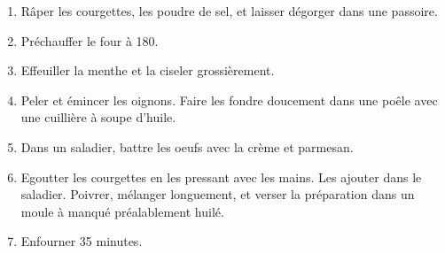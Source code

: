 
\begin{ingredients}
\end{ingredients}


\begin{recipe}
  \begin{enumerate}

  \item R\^aper les courgettes, les poudre de sel, et laisser
    d\'egorger dans une passoire.

  \item Pr\'echauffer le four \`a 180\C.

  \item Effeuiller la menthe et la ciseler grossi\`erement.

  \item Peler et \'emincer les oignons.  Faire les fondre doucement
    dans une  po\^ele avec une cuilli\`ere \`a soupe d'huile.

  \item Dans un saladier, battre les oeufs avec la cr\`eme et
    parmesan.

  \item Egoutter les courgettes en les pressant avec les mains.
    Les ajouter dans le saladier.  Poivrer, m\'elanger longuement, et
    verser la pr\'eparation dans un moule \`a manqu\'e pr\'ealablement
    huil\'e.

  \item Enfourner 35 minutes.

  \end{enumerate}
\end{recipe}
